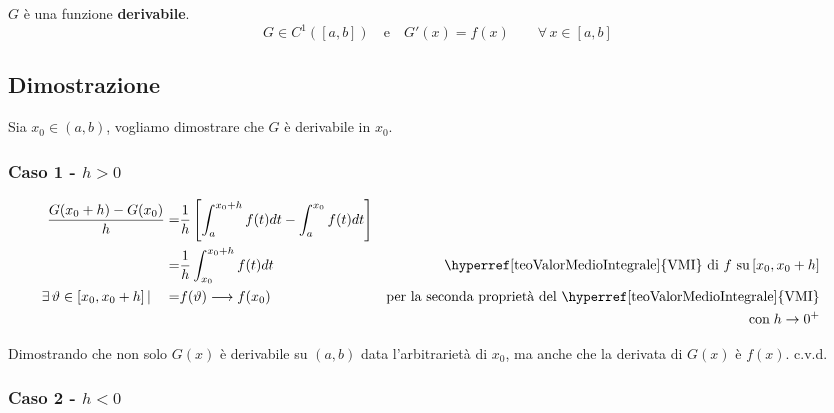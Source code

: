 \documentclass[../../dimostrazioni]{subfiles}
\begin{document}
                        \(G\) è una funzione \textbf{derivabile}.
                        \[G \in C^{1}([a, b]) \quad \text{e} \quad G'(x) = f(x) \qquad \forall \, x \in [a,b] \]
        
                    \subsection*{Dimostrazione}

                        Sia \(x_0 \in (a,b) \), vogliamo dimostrare che \(G\) è derivabile in \(x_0\).

                        \subsubsection*{Caso 1 - \(h>0\)}

                            \begin{align*}
                                \frac{G(x_0+h) - G(x_0)}{h} =& \frac{1}{h} \left[ \int_{a}^{x_0+h} f(t) dt - \int_{a}^{x_0} f(t)dt \right] \\
                                                            =& \frac{1}{h} \int_{x_0}^{x_0+h}f(t) dt & \text{\hyperref[teoValorMedioIntegrale]{VMI} di \(f\) su} \, [x_0, {x_0} +h]\\
                                \exists \, \vartheta \in [x_0, x_0+h] \, | \quad =& f(\vartheta) \longrightarrow f(x_0)          & \text{per la seconda proprietà del \hyperref[teoValorMedioIntegrale]{VMI}}& \\
                                &                            &  \text{con} \; h \rightarrow 0^{+}&
                            \end{align*}
                            
                            Dimostrando che non solo \(G(x)\) è derivabile su \((a,b)\) data l'arbitrarietà di \(x_0\), 
                            ma anche che la derivata di \(G(x)\) è \(f(x)\). c.v.d.

                        \subsubsection*{Caso 2 - \(h<0\)}
\end{document}
